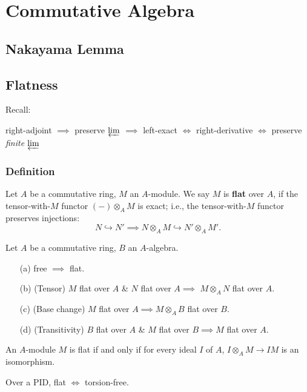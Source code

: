 \section{Commutative Algebra}

\subsection{Nakayama Lemma}

\subsection{Flatness}
Recall:
\begin{center}
    right-adjoint
    $\implies$ preserve $\varprojlim$
    $\implies$ left-exact
    $\iff$ right-derivative
    $\iff$ preserve \textit{finite} $\varprojlim$
\end{center}

\subsubsection{Definition}
Let $A$ be a commutative ring, $M$ an $A$-module.
We say $M$ is \textbf{flat} over $A$,
if the tensor-with-$M$ functor $(-)\otimes_A M$ is exact;
i.e., the tensor-with-$M$ functor preserves injections:
\[N\hookrightarrow N'\implies
N\otimes_A M\hookrightarrow N'\otimes_A M'.\]
\begin{proposition}
\label{basic property of flat}
Let $A$ be a commutative ring, $B$ an $A$-algebra.
\begin{enumerate}
    \item [(a)] free $\implies$ flat.
    \item [(b)] (Tensor) $M$ flat over $A$ \& $N$ flat over $A\implies$
    $M\otimes_A N$ flat over $A$.
    \item [(c)] (Base change)
    $M$ flat over $A\implies M\otimes_A B$ flat over $B$.
    \item [(d)] (Transitivity)
    $B$ flat over $A$ \& $M$ flat over $B\implies M$ flat over $A$. 
\end{enumerate}
\end{proposition}

\begin{theorem}
    An $A$-module $M$ is flat if and only if for every ideal $I$ of $A$,
    $I\otimes_A M\to IM$ is an isomorphism.
\end{theorem}
\begin{corollary}
    Over a PID, flat $\iff$ torsion-free.
\end{corollary}

